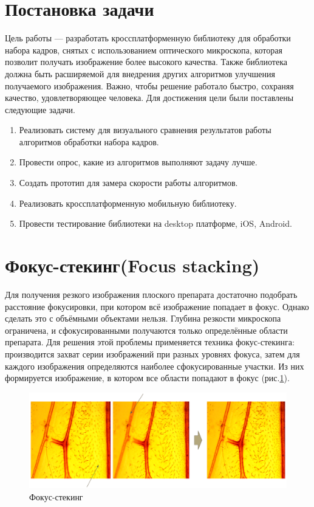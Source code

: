 \documentclass[14pt]{matmex-diploma-custom}
\begin{document}
\section{Постановка задачи}
Цель работы --- разработать кроссплатформенную библиотеку для обработки набора кадров, снятых с использованием оптического микроскопа, которая позволит получать изображение более высокого качества. Также библиотека должна быть расширяемой для внедрения других алгоритмов улучшения получаемого изображения. Важно, чтобы решение работало быстро, сохраняя качество, удовлетворяющее человека. Для достижения цели были поставлены следующие задачи.
\begin{enumerate}
    \item Реализовать систему для визуального сравнения результатов работы алгоритмов обработки набора кадров. 
    \item Провести опрос, какие из алгоритмов выполняют задачу лучше.
    \item Создать прототип для замера скорости работы алгоритмов.
    \item Реализовать кроссплатформенную мобильную библиотеку.
    \item Провести тестирование библиотеки на desktop платформе, iOS, Android.
\end{enumerate}


\section{Фокус-стекинг(Focus stacking)}
Для получения резкого изображения плоского препарата достаточно подобрать расстояние фокусировки, при котором всё изображение попадает в фокус. Однако сделать это с объёмными объектами нельзя. Глубина резкости микроскопа ограничена, и сфокусированными получаются только определённые области препарата. Для решения этой проблемы применяется техника фокус-стекинга: производится захват серии изображений при разных уровнях фокуса, затем для каждого изображения определяются наиболее сфокусированные участки. Из них формируется изображение, в котором все области попадают в фокус (рис.\ref{focus_stacking1}).

\begin{figure}[h]
    \centering
    \includegraphics[width=1.0\textwidth]{figures/fs1.png}
    \caption{Фокус-стекинг}
    \label{focus_stacking1}
\end{figure}
\end{document}
